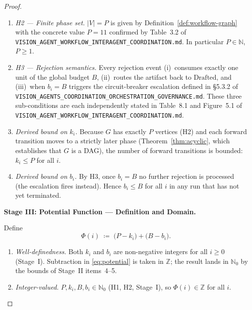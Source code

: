 \documentclass[12pt]{article}
\theoremstyle{definition}
\newcommand{\code}[1]{\texttt{#1}}
\newcommand{\VisionGov}{\code{VISION\_AGENTS\_\allowbreak COORDINATION\_\allowbreak ORCHESTRATION\_\allowbreak GOVERNANCE.md}}
\newcommand{\VisionFlow}{\code{VISION\_AGENT\_\allowbreak WORKFLOW\_\allowbreak INTERAGENT\_\allowbreak COORDINATION.md}}
\begin{document}
\begin{proof}
\begin{enumerate}
  \item \emph{H2 — Finite phase set.}  $|V| = P$ is given by
        Definition~\ref{def:workflow-graph} with the concrete value
        $P = 11$ confirmed by Table~3.2 of
        \VisionFlow{}.
        In particular $P \in \mathbb{N}$, $P \geq 1$.

  \item \emph{H3 — Rejection semantics.}  Every rejection event
        (i)~consumes exactly one unit of the global budget $B$,
        (ii)~routes the artifact back to $\mathrm{Drafted}$, and
        (iii)~when $b_i = B$ triggers the circuit-breaker escalation
        defined in \S5.3.2 of
        \VisionGov{}.  These three sub-conditions are each
        independently stated in Table~8.1 and Figure~5.1 of
        \VisionFlow{}.

  \item \emph{Derived bound on $k_i$.}  Because $G$ has exactly $P$
        vertices (H2) and each forward transition moves to a
        strictly later phase (Theorem~\ref{thm:acyclic}, which establishes
        that $G$ is a DAG), the number of forward transitions is
        bounded: $k_i \leq P$ for all $i$.

  \item \emph{Derived bound on $b_i$.}  By H3, once $b_i = B$ no
        further rejection is processed (the escalation fires
        instead).  Hence $b_i \leq B$ for all $i$ in any run that
        has not yet terminated.
\end{enumerate}

\medskip
\noindent\textbf{Stage III: Potential Function — Definition and Domain.}

Define
\begin{equation}
\label{eq:potential}
\Phi(i) \;\coloneqq\; \bigl(P - k_i\bigr) + \bigl(B - b_i\bigr).
\end{equation}

\begin{enumerate}
  \item \emph{Well-definedness.}  Both $k_i$ and $b_i$ are
        non-negative integers for all $i \geq 0$ (Stage~I).
        Subtraction in \eqref{eq:potential} is taken in $\mathbb{Z}$;
        the result lands in $\mathbb{N}_0$ by the bounds of Stage~II
        items~4--5.

  \item \emph{Integer-valued.}  $P, k_i, B, b_i \in \mathbb{N}_0$
        (H1, H2, Stage~I), so $\Phi(i) \in \mathbb{Z}$ for all $i$.


\end{enumerate}
\end{proof}
\end{document}
